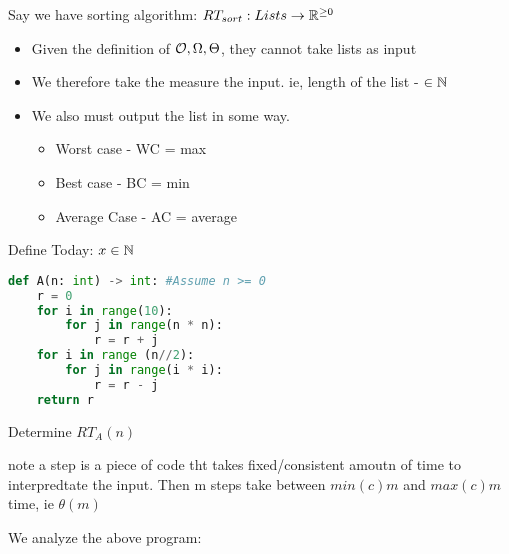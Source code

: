 \documentclass[12pt, letterpaper, twoside]{article}
\begin{document}
    Say we have sorting algorithm:  \hspace{10mm} $RT_{sort}: Lists \to \mathbb R^{\ge 0}$
    \begin{itemize}
        \item Given the definition of $\mathcal O, \Omega, \Theta$, they cannot take lists as input
        \item We therefore take the measure the input. ie, length of the list -  $ \in \mathbb N$
        \item We also must output the list in some way.
        \begin{itemize}
            \item Worst case - WC  = max
            \item Best case - BC  = min
            \item Average Case - AC  = average
        \end{itemize}
    \end{itemize}
    
    Define Today: $x \in \mathbb N$

    \begin{lstlisting}[language=Python]
def A(n: int) -> int: #Assume n >= 0
    r = 0
    for i in range(10):
        for j in range(n * n):
            r = r + j
    for i in range (n//2):
        for j in range(i * i):
            r = r - j
    return r
    \end{lstlisting}
    Determine $RT_A(n)$

    note a step is a piece of code tht takes fixed/consistent amoutn of time to interpredtate the input.
    \hspace*{10mm}Then m steps take between $min(c)m$ and $max(c)m$ time, ie $\theta(m)$

    We analyze the above program:
\end{document}
